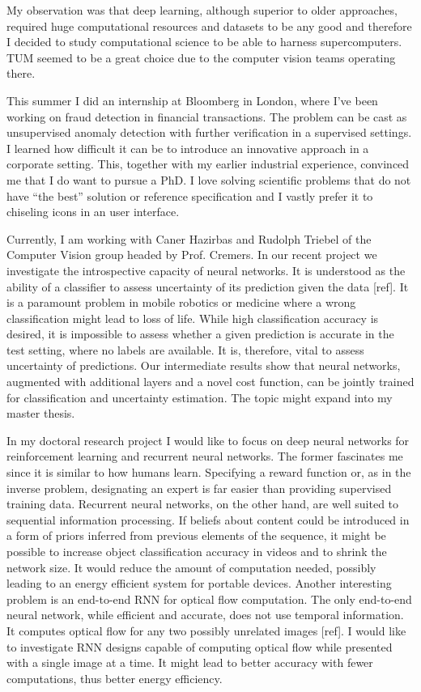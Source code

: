 \documentclass[12pt]{article}
\begin{document}
My observation was that deep learning, although superior to older approaches, required huge computational resources and datasets to be any good and therefore I decided to study computational science to be able to harness supercomputers. TUM seemed to be a great choice due to the computer vision teams operating there. 

This summer I did an internship at Bloomberg in London, where I've been working on fraud detection in financial transactions. The problem can be cast as unsupervised anomaly detection with further verification in a supervised settings. I learned how difficult it can be to introduce an innovative approach in a corporate setting. This, together with my earlier industrial experience, convinced me that I do want to pursue a PhD. I love solving scientific problems that do not have ``the best'' solution or reference specification and I vastly prefer it to chiseling icons in an user interface. 

Currently, I am working with Caner Hazirbas and Rudolph Triebel of the Computer Vision group headed by Prof. Cremers. In our recent project we investigate the introspective capacity of neural networks. It is understood as the ability of a classifier to assess uncertainty of its prediction given the data [ref]. It is a paramount problem in mobile robotics or medicine where a wrong classification might lead to loss of life. While high classification accuracy is desired, it is impossible to assess whether a given prediction is accurate in the test setting, where no labels are available. It is, therefore, vital to assess uncertainty of predictions. Our intermediate results show that neural networks, augmented with additional layers and a novel cost function, can be jointly trained for classification and uncertainty estimation. The topic might expand into my master thesis.

In my doctoral research project I would like to focus on deep neural networks for reinforcement learning and recurrent neural networks. The former fascinates me since it is similar to how humans learn. Specifying a reward function  or, as in the inverse problem, designating an expert is far easier than providing supervised training data. Recurrent neural networks, on the other hand, are well suited to sequential information processing. If beliefs about content could be introduced in a form of priors inferred from previous elements of the sequence, it might be possible to increase object classification accuracy in videos and to shrink the network size. It would reduce the amount of computation needed, possibly leading to an energy efficient system for portable devices. Another interesting problem is an end-to-end RNN for optical flow computation. The only end-to-end neural network, while efficient and accurate, does not use temporal information. It computes optical flow for any two possibly unrelated images [ref]. I would like to investigate RNN designs capable of computing optical flow while presented with a single image at a time. It might lead to better accuracy with fewer computations, thus better energy efficiency.
\end{document}
